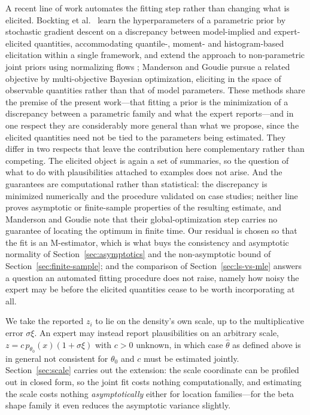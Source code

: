 A recent line of work automates the fitting step rather than changing what is elicited. Bockting et al.\ \cite{Bockting2024} learn the hyperparameters of a parametric prior by stochastic gradient descent on a discrepancy between model-implied and expert-elicited quantities, accommodating quantile-, moment- and histogram-based elicitation within a single framework, and extend the approach to non-parametric joint priors using normalizing flows \cite{Bockting2025}; Manderson and Goudie \cite{Manderson2023} pursue a related objective by multi-objective Bayesian optimization, eliciting in the space of observable quantities rather than that of model parameters. These methods share the premise of the present work---that fitting a prior is the minimization of a discrepancy between a parametric family and what the expert reports---and in one respect they are considerably more general than what we propose, since the elicited quantities need not be tied to the parameters being estimated. They differ in two respects that leave the contribution here complementary rather than competing. The elicited object is again a set of summaries, so the question of what to do with plausibilities attached to examples does not arise. And the guarantees are computational rather than statistical: the discrepancy is minimized numerically and the procedure validated on case studies; neither line proves asymptotic or finite-sample properties of the resulting estimate, and Manderson and Goudie note that their global-optimization step carries no guarantee of locating the optimum in finite time. Our residual is chosen so that the fit is an M-estimator, which is what buys the consistency and asymptotic normality of Section~\ref{sec:asymptotics} and the non-asymptotic bound of Section~\ref{sec:finite-sample}; and the comparison of Section~\ref{sec:ls-vs-mle} answers a question an automated fitting procedure does not raise, namely how noisy the expert may be before the elicited quantities cease to be worth incorporating at all.

\begin{remark}\label{rem:scale}
We take the reported $z_i$ to lie on the density's own scale, up to the multiplicative error $\sigma\xi$. An expert may instead report plausibilities on an arbitrary scale, $z=c\,p_{\theta_0}(x)(1+\sigma\xi)$ with $c>0$ unknown, in which case $\hat\theta$ as defined above is in general not consistent for $\theta_0$ and $c$ must be estimated jointly. Section~\ref{sec:scale} carries out the extension: the scale coordinate can be profiled out in closed form, so the joint fit costs nothing computationally, and estimating the scale costs nothing \emph{asymptotically} either for location families---for the beta shape family it even reduces the asymptotic variance slightly.
\end{remark}

